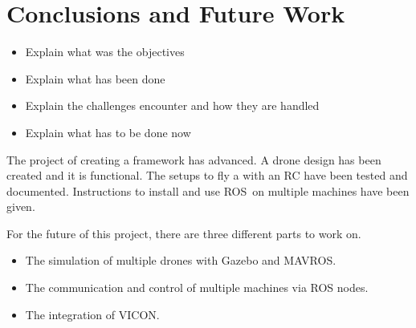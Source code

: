 \chapter{Conclusions and Future Work}

{\color{red}
\begin{itemize}
  \item Explain what was the objectives
  \item Explain what has been done
  \item Explain the challenges encounter and how they are handled
  \item Explain what has to be done now
\end{itemize}
}

The project of creating a framework has advanced.
A drone design has been created and it is functional.
The setups to fly a with an RC have been tested and documented.
Instructions to install and use ROS on multiple machines have been given.

For the future of this project, there are three different parts to work on.
\begin{itemize}
  \item The simulation of multiple drones with Gazebo and MAVROS.
  \item The communication and control of multiple machines via ROS nodes.
  \item The integration of VICON.
\end{itemize}
